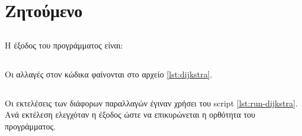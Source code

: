 \documentclass{article}
\newcommand{\eng}[1]{\foreignlanguage{english}{#1}} %
\begin{document}
\subsection{}

\subsection{}

\clearpage
\section{Ζητούμενο}

\subsection{}

Η έξοδος του προγράμματος είναι:

\begin{figure}[h]
    \centering
    
\end{figure}

\subsection{}

Οι αλλαγές στον κώδικα φαίνονται στο αρχείο \ref{lst:dijkstra}.

\subsection{}

Οι εκτελέσεις των διάφορων παραλλαγών έγιναν χρήσει του \eng{script}
\ref{lst:run-dijkstra}. Ανά εκτέλεση ελεγχόταν η έξοδος ώστε να 
επικυρώνεται η ορθότητα του προγράμματος.
\end{document}
